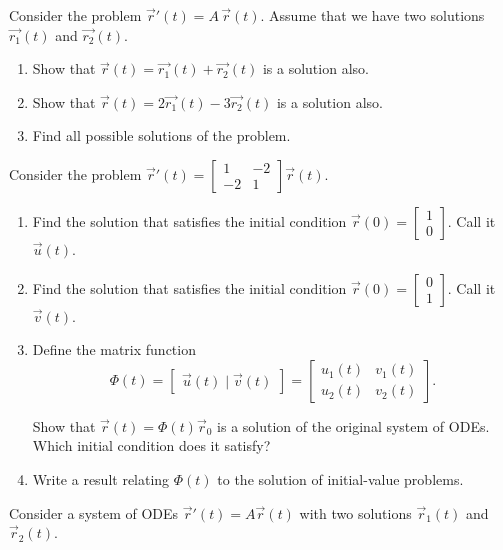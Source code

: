 \begin{exercises}
\begin{problist}
	
	\prob \label{prob:sys-superposition}Consider the problem \quad $\vec{r}'(t) = A \, \vec{r}(t)$.
	Assume that we have two solutions $\vec{r_1}(t)$ and $\vec{r_2}(t)$.
	\begin{enumerate}
		\item Show that $\vec{r}(t) = \vec{r_1}(t) + \vec{r_2}(t)$ is a solution also.
		\item Show that $\vec{r}(t) = 2\vec{r_1}(t) - 3\vec{r_2}(t)$ is a solution also.
		\item Find all possible solutions of the problem.
	\end{enumerate}
	
	
		\prob Consider the problem $\vec{r}'(t) = \begin{bmatrix} 1 & -2 \\ -2 & 1 \end{bmatrix} \vec{r}(t)$.
		\begin{enumerate}
			\item Find the solution that satisfies the initial condition $\vec{r}(0)=\begin{bmatrix}1 \\ 0\end{bmatrix}$. Call it $\vec{u}(t)$.
			\item Find the solution that satisfies the initial condition $\vec{r}(0)=\begin{bmatrix}0 \\ 1\end{bmatrix}$. Call it $\vec{v}(t)$.
			\item Define the matrix function
			$$ \Phi(t) = \begin{bmatrix} \vec{u}(t) \; | \; \vec{v}(t) \end{bmatrix} = \begin{bmatrix} u_1(t) & v_1(t) \\ u_2(t) & v_2(t) \end{bmatrix}.$$
			
			Show that $\vec{r}(t) = \Phi(t) \vec{r}_0$ is a solution of the original system of ODEs. Which initial condition does it satisfy?
			
			\item Write a result relating $\Phi(t)$ to the solution of initial-value problems.
			\end{enumerate}

	
	
		\prob \label{mod16:prob-W1}Consider a system of ODEs $\vec{r}'(t) = A \vec{r}(t)$ with two solutions $\vec{r}_1(t)$ and $\vec{r}_2(t)$. 
		

\end{problist}
\end{exercises}
